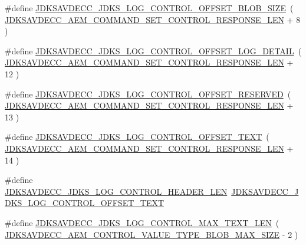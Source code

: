 \begin{DoxyCompactItemize}
\item 
\#define \hyperlink{group__jdks__log_ga14027480ca9c47f6e02e3d96e3e9a1ad}{J\+D\+K\+S\+A\+V\+D\+E\+C\+C\+\_\+\+J\+D\+K\+S\+\_\+\+L\+O\+G\+\_\+\+C\+O\+N\+T\+R\+O\+L\+\_\+\+O\+F\+F\+S\+E\+T\+\_\+\+B\+L\+O\+B\+\_\+\+S\+I\+ZE}~( \hyperlink{group__command__set__control__response_gad54c9d8dd021fce5cb24c880401d316f}{J\+D\+K\+S\+A\+V\+D\+E\+C\+C\+\_\+\+A\+E\+M\+\_\+\+C\+O\+M\+M\+A\+N\+D\+\_\+\+S\+E\+T\+\_\+\+C\+O\+N\+T\+R\+O\+L\+\_\+\+R\+E\+S\+P\+O\+N\+S\+E\+\_\+\+L\+EN} + 8 )
\item 
\#define \hyperlink{group__jdks__log_ga15244e4065b3ef420cd990e0d2e6bc0d}{J\+D\+K\+S\+A\+V\+D\+E\+C\+C\+\_\+\+J\+D\+K\+S\+\_\+\+L\+O\+G\+\_\+\+C\+O\+N\+T\+R\+O\+L\+\_\+\+O\+F\+F\+S\+E\+T\+\_\+\+L\+O\+G\+\_\+\+D\+E\+T\+A\+IL}~( \hyperlink{group__command__set__control__response_gad54c9d8dd021fce5cb24c880401d316f}{J\+D\+K\+S\+A\+V\+D\+E\+C\+C\+\_\+\+A\+E\+M\+\_\+\+C\+O\+M\+M\+A\+N\+D\+\_\+\+S\+E\+T\+\_\+\+C\+O\+N\+T\+R\+O\+L\+\_\+\+R\+E\+S\+P\+O\+N\+S\+E\+\_\+\+L\+EN} + 12 )
\item 
\#define \hyperlink{group__jdks__log_gad860e4d61ae3f91cd3f9799e6b1dd3c5}{J\+D\+K\+S\+A\+V\+D\+E\+C\+C\+\_\+\+J\+D\+K\+S\+\_\+\+L\+O\+G\+\_\+\+C\+O\+N\+T\+R\+O\+L\+\_\+\+O\+F\+F\+S\+E\+T\+\_\+\+R\+E\+S\+E\+R\+V\+ED}~( \hyperlink{group__command__set__control__response_gad54c9d8dd021fce5cb24c880401d316f}{J\+D\+K\+S\+A\+V\+D\+E\+C\+C\+\_\+\+A\+E\+M\+\_\+\+C\+O\+M\+M\+A\+N\+D\+\_\+\+S\+E\+T\+\_\+\+C\+O\+N\+T\+R\+O\+L\+\_\+\+R\+E\+S\+P\+O\+N\+S\+E\+\_\+\+L\+EN} + 13 )
\item 
\#define \hyperlink{group__jdks__log_gaa3f2c42190fdfb5a9f8927254dcc38f0}{J\+D\+K\+S\+A\+V\+D\+E\+C\+C\+\_\+\+J\+D\+K\+S\+\_\+\+L\+O\+G\+\_\+\+C\+O\+N\+T\+R\+O\+L\+\_\+\+O\+F\+F\+S\+E\+T\+\_\+\+T\+E\+XT}~( \hyperlink{group__command__set__control__response_gad54c9d8dd021fce5cb24c880401d316f}{J\+D\+K\+S\+A\+V\+D\+E\+C\+C\+\_\+\+A\+E\+M\+\_\+\+C\+O\+M\+M\+A\+N\+D\+\_\+\+S\+E\+T\+\_\+\+C\+O\+N\+T\+R\+O\+L\+\_\+\+R\+E\+S\+P\+O\+N\+S\+E\+\_\+\+L\+EN} + 14 )
\item 
\#define \hyperlink{group__jdks__log_gaade756dffaac6e4f6d3d3b16e4cea38b}{J\+D\+K\+S\+A\+V\+D\+E\+C\+C\+\_\+\+J\+D\+K\+S\+\_\+\+L\+O\+G\+\_\+\+C\+O\+N\+T\+R\+O\+L\+\_\+\+H\+E\+A\+D\+E\+R\+\_\+\+L\+EN}~\hyperlink{group__jdks__log_gaa3f2c42190fdfb5a9f8927254dcc38f0}{J\+D\+K\+S\+A\+V\+D\+E\+C\+C\+\_\+\+J\+D\+K\+S\+\_\+\+L\+O\+G\+\_\+\+C\+O\+N\+T\+R\+O\+L\+\_\+\+O\+F\+F\+S\+E\+T\+\_\+\+T\+E\+XT}
\item 
\#define \hyperlink{group__jdks__log_gaaa43d62d581d06b4c563a3ac9f689730}{J\+D\+K\+S\+A\+V\+D\+E\+C\+C\+\_\+\+J\+D\+K\+S\+\_\+\+L\+O\+G\+\_\+\+C\+O\+N\+T\+R\+O\+L\+\_\+\+M\+A\+X\+\_\+\+T\+E\+X\+T\+\_\+\+L\+EN}~( \hyperlink{group__aem__command_ga91176affe15020f1b22b04518eeb3d30}{J\+D\+K\+S\+A\+V\+D\+E\+C\+C\+\_\+\+A\+E\+M\+\_\+\+C\+O\+N\+T\+R\+O\+L\+\_\+\+V\+A\+L\+U\+E\+\_\+\+T\+Y\+P\+E\+\_\+\+B\+L\+O\+B\+\_\+\+M\+A\+X\+\_\+\+S\+I\+ZE} -\/ 2 )
\end{DoxyCompactItemize}
